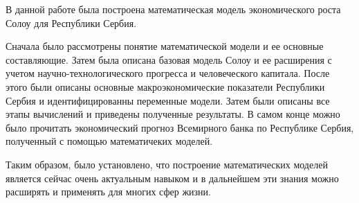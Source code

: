 \Conclusion

В данной работе была построена математическая модель экономического роста Солоу для Республики Сербия.

Сначала было рассмотрены понятие математической модели и ее основные составляющие.
Затем была описана базовая модель Солоу и ее расширения с учетом научно-технологического прогресса и человеческого капитала.
После этого были описаны основные макроэкономические показатели Республики Сербия и идентифицированны переменные модели.
Затем были описаны все этапы вычислений и приведены полученные результаты.
В самом конце можно было прочитать экономический прогноз Всемирного банка по Республике Сербия, полученный с помощью математичеких моделей.

Таким образом, было установлено, что построение математических моделей является сейчас очень актуальным навыком и в дальнейшем эти знания можно расширять и применять для многих сфер жизни.
